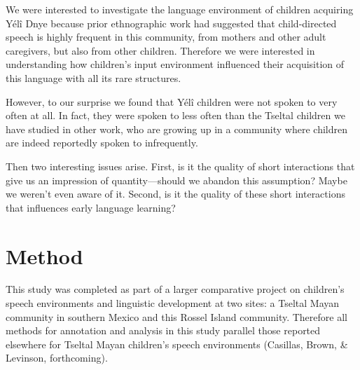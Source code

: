 \documentclass[floatsintext,man]{apa6}
\theoremstyle{definition}
\theoremstyle{definition}
\theoremstyle{definition}
\theoremstyle{remark}
\begin{document}
We were interested to investigate the language environment of children
acquiring Yélî Dnye because prior ethnographic work had suggested that
child-directed speech is highly frequent in this community, from mothers
and other adult caregivers, but also from other children. Therefore we
were interested in understanding how children's input environment
influenced their acquisition of this language with all its rare
structures.

However, to our surprise we found that Yélî children were not spoken to
very often at all. In fact, they were spoken to less often than the
Tseltal children we have studied in other work, who are growing up in a
community where children are indeed reportedly spoken to infrequently.

Then two interesting issues arise. First, is it the quality of short
interactions that give us an impression of quantity---should we abandon
this assumption? Maybe we weren't even aware of it. Second, is it the
quality of these short interactions that influences early language
learning?

\section{Method}\label{method}

This study was completed as part of a larger comparative project on
children's speech environments and linguistic development at two sites:
a Tseltal Mayan community in southern Mexico and this Rossel Island
community. Therefore all methods for annotation and analysis in this
study parallel those reported elsewhere for Tseltal Mayan children's
speech environments (Casillas, Brown, \& Levinson, forthcoming).
\end{document}
